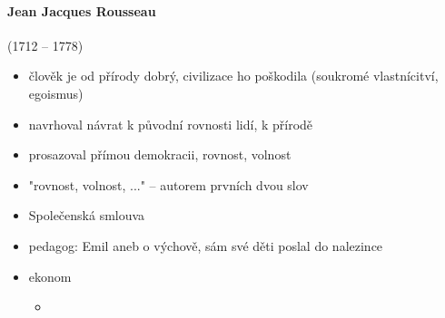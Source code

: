 \paragraph{Jean Jacques Rousseau} (1712 -- 1778)
\begin{itemize}
\item člověk je od přírody dobrý, civilizace ho poškodila  (soukromé vlastnícitví, egoismus)
\item navrhoval návrat k původní rovnosti lidí, k přírodě
\item prosazoval přímou demokracii, rovnost, volnost
\item "rovnost, volnost, ..." -- autorem prvních dvou slov
\item Společenská smlouva
\item pedagog: Emil aneb o výchově, sám své děti poslal do nalezince
\item ekonom
	\begin{itemize}
	\item
	\end{itemize}
\end{itemize}




\timeline
